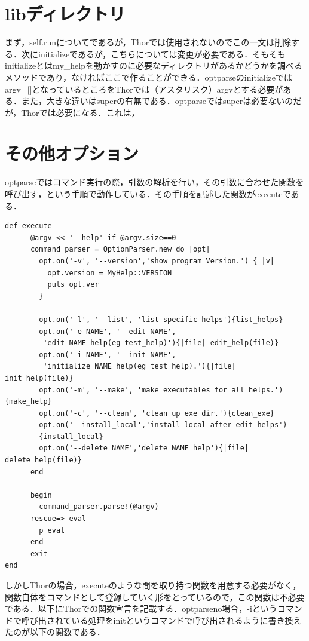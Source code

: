 \section{libディレクトリ}\label{libux30c7ux30a3ux30ecux30afux30c8ux30ea}

まず，self.runについてであるが，Thorでは使用されないのでこの一文は削除する．次にinitializeであるが，こちらについては変更が必要である．そもそもinitializeとはmy\_helpを動かすのに必要なディレクトリがあるかどうかを調べるメソッドであり，なければここで作ることができる．optparseのinitializeではargv={[}{]}となっているところをThorでは（アスタリスク）argvとする必要がある．また，大きな違いはsuperの有無である．optparseではsuperは必要ないのだが，Thorでは必要になる．これは，

\section{その他オプション}\label{ux305dux306eux4ed6ux30aaux30d7ux30b7ux30e7ux30f3}

optparseではコマンド実行の際，引数の解析を行い，その引数に合わせた関数を呼び出す，という手順で動作している．その手順を記述した関数がexecuteである．


\begin{screen}
{\small
\begin{verbatim}
def execute
      @argv << '--help' if @argv.size==0
      command_parser = OptionParser.new do |opt|
        opt.on('-v', '--version','show program Version.') { |v|
          opt.version = MyHelp::VERSION
          puts opt.ver
        }
        
        opt.on('-l', '--list', 'list specific helps'){list_helps}
        opt.on('-e NAME', '--edit NAME',
         'edit NAME help(eg test_help)'){|file| edit_help(file)}
        opt.on('-i NAME', '--init NAME',
         'initialize NAME help(eg test_help).'){|file| init_help(file)}
        opt.on('-m', '--make', 'make executables for all helps.'){make_help}
        opt.on('-c', '--clean', 'clean up exe dir.'){clean_exe}
        opt.on('--install_local','install local after edit helps')
        {install_local}
        opt.on('--delete NAME','delete NAME help'){|file| delete_help(file)}
      end
      
      begin
        command_parser.parse!(@argv)
      rescue=> eval
        p eval
      end
      exit
end
\end{verbatim}}
\end{screen}

しかしThorの場合，executeのような間を取り持つ関数を用意する必要がなく，関数自体をコマンドとして登録していく形をとっているので，この関数は不必要である．以下にThorでの関数宣言を記載する．optparseno場合，-iというコマンドで呼び出されている処理をinitというコマンドで呼び出されるように書き換えたのが以下の関数である．



